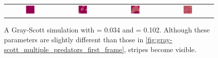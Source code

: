 \begin{figure}[h]
\centering
\mySfFamily
\begin{tabular}{c c c c}
\includegraphics[width = 0.19\textwidth]{../images_CMYK/f038_k102_multi_Moment_1} & \includegraphics[width = 0.19\textwidth]{../images_CMYK/f038_k102_multi_Moment_2} & \includegraphics[width = 0.19\textwidth]{../images_CMYK/f038_k102_multi_Moment_3} & \includegraphics[width = 0.19\textwidth]{../images_CMYK/f038_k102_multi_Moment_4}
\end{tabular}
\caption{A Gray-Scott simulation with  = 0.034 and  = 0.102. Although these parameters are slightly different than those in \autoref{fig:gray-scott_multiple_predators_first_frame}, stripes become visible.}
\label{fig:gray-scott_f38_k102_first_frame}
\end{figure}


